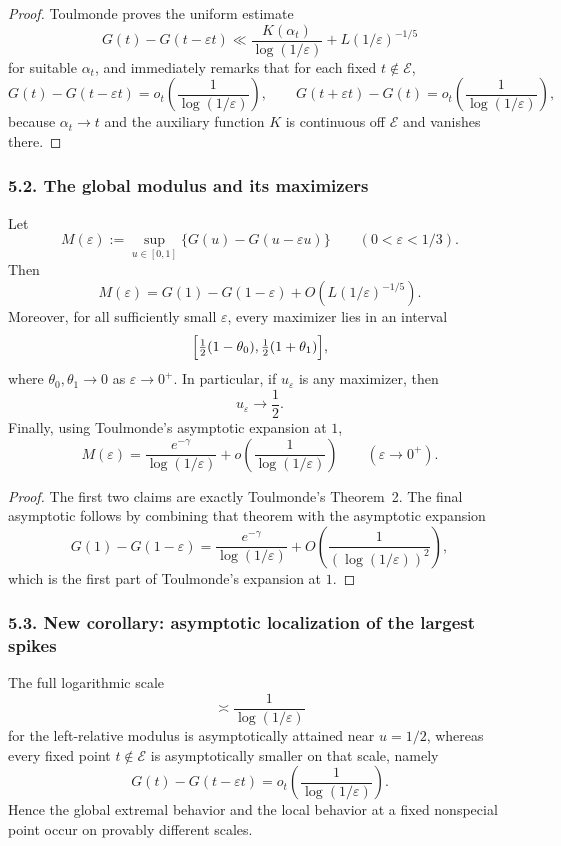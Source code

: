 \begin{proof}
Toulmonde proves the uniform estimate
\[
G(t)-G(t-\varepsilon t)\ll \frac{K(\alpha_t)}{\log(1/\varepsilon)}+L(1/\varepsilon)^{-1/5}
\]
for suitable $\alpha_t$, and immediately remarks that for each fixed $t\notin\mathcal E$,
\[
G(t)-G(t-\varepsilon t)=o_t\!\left(\frac1{\log(1/\varepsilon)}\right),
\qquad
G(t+\varepsilon t)-G(t)=o_t\!\left(\frac1{\log(1/\varepsilon)}\right),
\]
because $\alpha_t\to t$ and the auxiliary function $K$ is continuous off $\mathcal E$ and vanishes there.
\end{proof}

\subsubsection*{5.2. The global modulus and its maximizers}

\begin{proposition}\label{prop:global-modulus-round10}
Let
\[
M(\varepsilon):=\sup_{u\in[0,1]}\{G(u)-G(u-\varepsilon u)\}
\qquad(0<\varepsilon<1/3).
\]
Then
\[
M(\varepsilon)=G(1)-G(1-\varepsilon)+O(L(1/\varepsilon)^{-1/5}).
\]
Moreover, for all sufficiently small $\varepsilon$, every maximizer lies in an interval
\[
\Bigl[\tfrac12(1-\theta_0),\tfrac12(1+\theta_1)\Bigr],
\]
where $\theta_0,\theta_1\to0$ as $\varepsilon\to0^+$.
In particular, if $u_\varepsilon$ is any maximizer, then
\[
u_\varepsilon\to\frac12.
\]
Finally, using Toulmonde's asymptotic expansion at $1$,
\[
M(\varepsilon)=\frac{e^{-\gamma}}{\log(1/\varepsilon)}+o\!\left(\frac1{\log(1/\varepsilon)}\right)
\qquad(\varepsilon\to0^+).
\]
\end{proposition}

\begin{proof}
The first two claims are exactly Toulmonde's Theorem~2. The final asymptotic follows by combining that theorem with the asymptotic expansion
\[
G(1)-G(1-\varepsilon)=\frac{e^{-\gamma}}{\log(1/\varepsilon)}+O\!\left(\frac1{(\log(1/\varepsilon))^2}\right),
\]
which is the first part of Toulmonde's expansion at $1$.
\end{proof}

\subsubsection*{5.3. New corollary: asymptotic localization of the largest spikes}

\begin{corollary}\label{cor:localization}
The full logarithmic scale
\[
\asymp \frac1{\log(1/\varepsilon)}
\]
for the left-relative modulus is asymptotically attained near $u=1/2$, whereas every fixed point $t\notin\mathcal E$ is asymptotically smaller on that scale, namely
\[
G(t)-G(t-\varepsilon t)=o_t\!\left(\frac1{\log(1/\varepsilon)}\right).
\]
Hence the global extremal behavior and the local behavior at a fixed nonspecial point occur on provably different scales.
\end{corollary}

